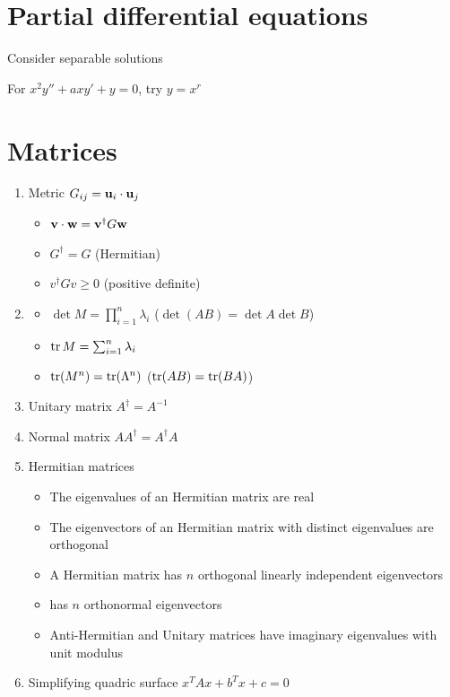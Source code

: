 \documentclass{article}
\theoremstyle{remark}
\theoremstyle{remark}
\begin{document}
    \section*{Partial differential equations}
    Consider separable solutions
    
    For $x^2y''+axy'+y=0$, try $y=x^r$

    \section*{Matrices}
    \begin{enumerate}
        \item Metric $G_{ij}=\vb{u}_i\cdot\vb{u}_j$\begin{itemize}
            \item $\vb{v}\cdot\vb{w}=\vb{v}^\dagger G\vb{w}$
            \item $G^\dagger = G$ (Hermitian)
            \item $v^\dagger G v\geq 0$ (positive definite)
        \end{itemize}
        \item \begin{itemize}
            \item $\det M = \prod_{i=1}^{n}\lambda_i$ ($\det(AB)=\det A\det B$)
            \item $\tr M = \sum_{i=1}^{n}\lambda_i$
            \item $\tr(M^n) = \tr(\Lambda^n)$ ($\tr(AB)=\tr(BA)$)
        \end{itemize}
        \item Unitary matrix $A^\dagger = A^{-1}$
        \item Normal matrix $AA^\dagger = A^\dagger A$
        \item Hermitian matrices\begin{itemize}
            \item The eigenvalues of an Hermitian matrix are real
            \item The eigenvectors of an Hermitian matrix with distinct eigenvalues are orthogonal
            \item A Hermitian matrix has $n$ orthogonal linearly independent eigenvectors
            \item has $n$ orthonormal eigenvectors
            \item Anti-Hermitian and Unitary matrices have imaginary eigenvalues with unit modulus
        \end{itemize}
        \item Simplifying quadric surface $x^T A x+b^T x +c=0$\begin{itemize}

\end{itemize}
\end{enumerate}
\end{document}
